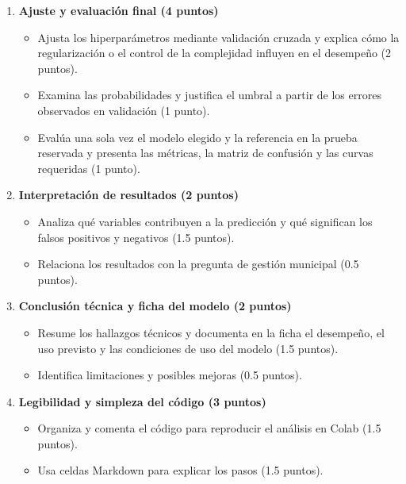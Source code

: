 \documentclass[a4,11pt]{aleph-notas}
\begin{document}
\begin{enumerate}[leftmargin=*,label=\textbf{\arabic*.}]
    \item \textbf{Ajuste y evaluación final (4 puntos)}
    \begin{itemize}[leftmargin=*]
        \item Ajusta los hiperparámetros mediante validación cruzada y explica cómo la regularización o el control de la complejidad influyen en el desempeño (2 puntos).
        \item Examina las probabilidades y justifica el umbral a partir de los errores observados en validación (1 punto).
        \item Evalúa una sola vez el modelo elegido y la referencia en la prueba reservada y presenta las métricas, la matriz de confusión y las curvas requeridas (1 punto).
    \end{itemize}

    \item \textbf{Interpretación de resultados (2 puntos)}
    \begin{itemize}[leftmargin=*]
        \item Analiza qué variables contribuyen a la predicción y qué significan los falsos positivos y negativos (1.5 puntos).
        \item Relaciona los resultados con la pregunta de gestión municipal (0.5 puntos).
    \end{itemize}

    \item \textbf{Conclusión técnica y ficha del modelo (2 puntos)}
    \begin{itemize}[leftmargin=*]
        \item Resume los hallazgos técnicos y documenta en la ficha el desempeño, el uso previsto y las condiciones de uso del modelo (1.5 puntos).
        \item Identifica limitaciones y posibles mejoras (0.5 puntos).
    \end{itemize}

    \item \textbf{Legibilidad y simpleza del código (3 puntos)}
    \begin{itemize}[leftmargin=*]
        \item Organiza y comenta el código para reproducir el análisis en Colab (1.5 puntos).
        \item Usa celdas Markdown para explicar los pasos (1.5 puntos).
    \end{itemize}
\end{enumerate}
\end{document}
